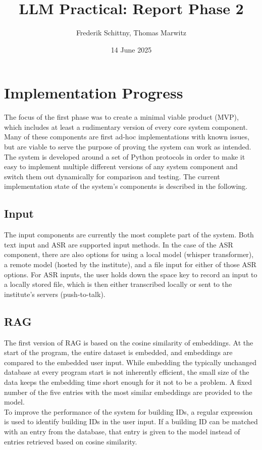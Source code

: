 \documentclass{article}
\title{LLM Practical: Report Phase 2}
\author{Frederik Schittny, Thomas Marwitz}
\date{14 June 2025}
\begin{document}
\maketitle

\section{Implementation Progress}
The focus of the first phase was to create a minimal viable product (MVP), which includes at least a rudimentary version of every core system component. Many of these components are first ad-hoc implementations with known issues, but are viable to serve the purpose of proving the system can work as intended. The system is developed around a set of Python protocols in order to make it easy to implement multiple different versions of any system component and switch them out dynamically for comparison and testing. The current implementation state of the system's components is described in the following.

\subsection{Input}
The input components are currently the most complete part of the system. Both text input and ASR are supported input methods. In the case of the ASR component, there are also options for using a local model (whisper transformer), a remote model (hosted by the institute), and a file input for either of those ASR options. For ASR inputs, the user holds down the space key to record an input to a locally stored file, which is then either transcribed locally or sent to the institute's servers (push-to-talk).

\subsection{RAG}
The first version of RAG is based on the cosine similarity of embeddings. At the start of the program, the entire dataset is embedded, and embeddings are compared to the embedded user input. While embedding the typically unchanged database at every program start is not inherently efficient, the small size of the data keeps the embedding time short enough for it not to be a problem. A fixed number of the five entries with the most similar embeddings are provided to the model.\\

To improve the performance of the system for building IDs, a regular expression is used to identify building IDs in the user input. If a building ID can be matched with an entry from the database, that entry is given to the model instead of entries retrieved based on cosine similarity.
\end{document}
